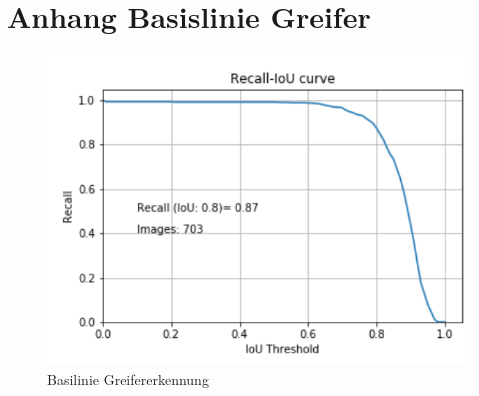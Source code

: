 \chapter{Anhang Basislinie Greifer}
\label{appendix:BasislinieGrapple}


\begin{figure}[h]
	\centering
	\includegraphics[width=1\textwidth, center]{bilder/Anhang/Grappel_Baseline_Recall_IoU_Curve.png}
	\caption[RecallIoUGrappleBaseline]{Basilinie Greifererkennung}
	\label{img:RecallIoUGrappleBaseline}
\end{figure}	

